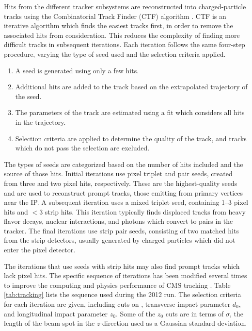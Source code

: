 Hits from the different tracker subsystems are reconstructed into charged-particle tracks using the Combinatorial Track Finder (CTF) algorithm \cite{TrackingJINST}. CTF is an iterative algorithm which finds the easiest tracks first, in order to remove the associated hits from consideration. This reduces the complexity of finding more difficult tracks in subsequent iterations. Each iteration follows the same four-step procedure, varying the type of seed used and the selection criteria applied.
\begin{enumerate}
\item A seed is generated using only a few hits.
\item Additional hits are added to the track based on the extrapolated trajectory of the seed.
\item The parameters of the track are estimated using a fit which considers all hits in the trajectory.
\item Selection criteria are applied to determine the quality of the track, and tracks which do not pass the selection are excluded.
\end{enumerate}

The types of seeds are categorized based on the number of hits included and the source of those hits. Initial iterations use pixel triplet and pair seeds, created from three and two pixel hits, respectively. These are the highest-quality seeds and are used to reconstruct prompt tracks, those emitting from primary vertices near the IP. A subsequent iteration uses a mixed triplet seed, containing 1--3 pixel hits and ${<}3$ strip hits. This iteration typically finds displaced tracks from heavy flavor decays, nuclear interactions, and photons which convert to \EpEm\xspace pairs in the tracker. The final iterations use strip pair seeds, consisting of two matched hits from the strip detectors, usually generated by charged particles which did not enter the pixel detector.

The iterations that use seeds with strip hits may also find prompt tracks which lack pixel hits. The specific sequence of iterations has been modified several times to improve the computing and physics performance of CMS tracking \cite{Tracking2012}. Table \ref{tab:tracking} lists the sequence used during the 2012 run. The selection criteria for each iteration are given, including cuts on \pt, transverse impact parameter $d_0$, and longitudinal impact parameter $z_0$. Some of the $z_0$ cuts are in terms of $\sigma$, the length of the beam spot in the $z$-direction used as a Gaussian standard deviation.

